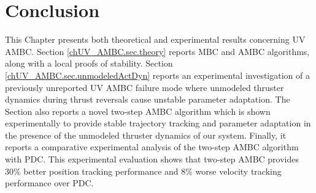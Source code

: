 \section{Conclusion}  \label{chUV_AMBC.sec.conclusion}

This Chapter presents both theoretical and experimental results
concerning \ac{UV} \ac{AMBC}.
%
Section \ref{chUV_AMBC.sec.theory} reports \ac{MBC} and \ac{AMBC}
algorithms, along with a local proofs of stability.
%
Section \ref{chUV_AMBC.sec.unmodeledActDyn} reports an experimental
investigation of a previously unreported \ac{UV} \ac{AMBC} failure
mode where unmodeled thruster dynamics during thrust reversals cause
unstable parameter adaptation.
%
The Section also reports a novel two-step \ac{AMBC} algorithm which is
shown experimentally to provide stable trajectory tracking and
parameter adaptation in the presence of the unmodeled thruster
dynamics of our system.
%
Finally, it reports a comparative experimental analysis of the
two-step \ac{AMBC} algorithm with \ac{PDC}.
%
This experimental evaluation shows that two-step \ac{AMBC} provides
30\% better position tracking performance and 8\% worse velocity
tracking performance over \ac{PDC}.